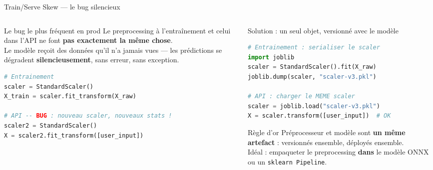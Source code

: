 \documentclass[aspectratio=169, 10pt]{beamer}
\begin{document}
\begin{frame}[fragile]{Train/Serve Skew --- le bug silencieux}
  \begin{columns}[T]
    \begin{column}{0.48\textwidth}
      \begin{alertblock}{Le bug le plus fréquent en prod}
        Le preprocessing à l'entraînement et celui
        dans l'API ne font \textbf{pas exactement la même chose}.\\[4pt]
        Le modèle reçoit des données qu'il n'a jamais vues ---
        les prédictions se dégradent \textbf{silencieusement},
        sans erreur, sans exception.
      \end{alertblock}
      \vspace{4pt}
\begin{lstlisting}[language=Python, basicstyle=\ttfamily\scriptsize, numbers=none]
# Entrainement
scaler = StandardScaler()
X_train = scaler.fit_transform(X_raw)

# API -- BUG : nouveau scaler, nouveaux stats !
scaler2 = StandardScaler()
X = scaler2.fit_transform([user_input])
\end{lstlisting}
    \end{column}
    \begin{column}{0.48\textwidth}
      \begin{exampleblock}{Solution : un seul objet, versionné avec le modèle}
\begin{lstlisting}[language=Python, basicstyle=\ttfamily\scriptsize, numbers=none]
# Entrainement : serialiser le scaler
import joblib
scaler = StandardScaler().fit(X_raw)
joblib.dump(scaler, "scaler-v3.pkl")

# API : charger le MEME scaler
scaler = joblib.load("scaler-v3.pkl")
X = scaler.transform([user_input])  # OK
\end{lstlisting}
      \end{exampleblock}
      \vspace{2pt}
      \begin{block}{Règle d'or}
        Préprocesseur et modèle sont \textbf{un même artefact} :
        versionnés ensemble, déployés ensemble.\\[2pt]
        Idéal : empaqueter le preprocessing \textbf{dans} le modèle ONNX
        ou un \texttt{sklearn Pipeline}.
      \end{block}
    \end{column}
  \end{columns}
\end{frame}
\end{document}
